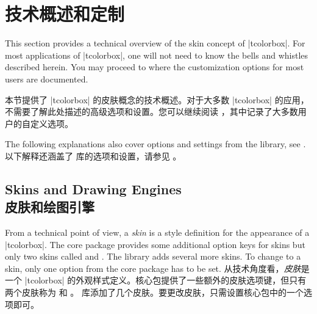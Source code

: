 \section{技术概述和定制}\label{sec:technical}%
%
\begin{stripedbox}
This section provides a technical overview of the skin concept of |tcolorbox|.
For most applications of |tcolorbox|, one will not need to know the bells and
whistles described herein.
You may proceed to  where the customization options
for most users are documented.
\tcblower

本节提供了 |tcolorbox| 的皮肤概念的技术概述。对于大多数 |tcolorbox| 的应用，不需要了解此处描述的高级选项和设置。您可以继续阅读 ，其中记录了大多数用户的自定义选项。
\end{stripedbox}

\begin{stripedbox}
The following explanations also cover options and settings from the  library,
see  .
\tcblower
以下解释还涵盖了  库的选项和设置，请参见 。
\end{stripedbox}

% 
\subsection{Skins and Drawing Engines\\皮肤和绘图引擎}\label{sec:skincorekeys}
\begin{stripedbox}
From a technical point of view, a \emph{skin} is a style definition for the
appearance of a |tcolorbox|. The core package provides some additional
option keys for skins but only two skins called 
and .
The  library adds several more skins. To change to a skin, only one
option from the core package has to be set.
\tcblower
从技术角度看，\emph{皮肤}是一个 |tcolorbox| 的外观样式定义。核心包提供了一些额外的皮肤选项键，但只有两个皮肤称为  和 。  库添加了几个皮肤。要更改皮肤，只需设置核心包中的一个选项即可。
\end{stripedbox}

